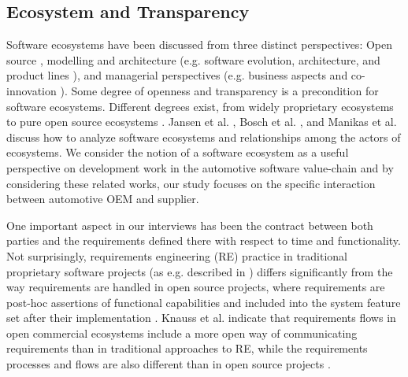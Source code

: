 \subsection{Ecosystem and Transparency}
Software ecosystems have been discussed from three distinct perspectives: Open source
\cite{Scacchi2009}, modelling and architecture (e.g. software evolution, architecture, and product lines \cite{Bosch2009}), and managerial perspectives (e.g. business aspects and co-innovation \cite{Jansen2012b}). 
Some degree of openness and transparency is a precondition for software ecosystems. Different degrees exist, from widely proprietary ecosystems to pure open source ecosystems \cite{Angeren2012,Jansen2012c}.
Jansen et al. \cite{Jansen2012a}, Bosch et al. \cite{Bosch2009}, and Manikas et al. \cite{Manikas2013b} discuss how to analyze software ecosystems and relationships among the actors of ecosystems. 
We consider the notion of a software ecosystem as a useful perspective on development work in the automotive software value-chain \cite{Knauss2014d} and by considering these related works, our study focuses on the specific interaction between automotive OEM and supplier.

One important aspect in our interviews has been the contract between both parties and the requirements defined there with respect to time and functionality. 
Not surprisingly, requirements engineering (RE) %
practice in traditional proprietary software projects (as e.g. described in \cite{Robertson1999,Ruhe2010}) differs significantly from the way requirements are handled in open source projects, where requirements are post-hoc assertions of functional capabilities and included into the system feature set after their implementation \cite{Scacchi2009}.
Knauss et al. indicate that requirements flows in open commercial ecosystems include a more open way of communicating requirements than in traditional approaches to RE, while %
the requirements processes and flows are also different than in open source projects \cite{KYB+2016}. 


